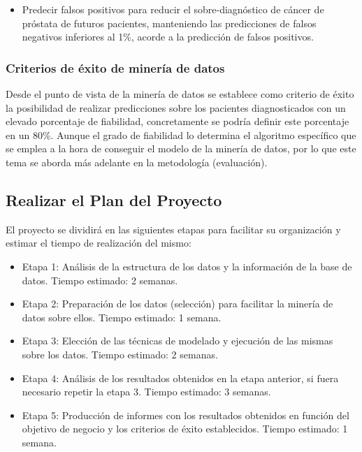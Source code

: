 \documentclass{article}
\begin{document}
\begin{itemize}
	\item Predecir falsos positivos para reducir el sobre-diagnóstico de cáncer de próstata de futuros pacientes, manteniendo las predicciones de falsos negativos inferiores al 1\%, acorde a la predicción de falsos positivos.
\end{itemize}

\subsubsection{Criterios de éxito de minería de datos}\label{Criterio de éxito de minería de datos}
Desde el punto de vista de la minería de datos se establece como criterio de éxito la posibilidad de realizar predicciones sobre los pacientes diagnosticados con un elevado porcentaje de fiabilidad, concretamente se podría definir este porcentaje en un 80\%. Aunque el grado de fiabilidad lo determina el algoritmo específico que se emplea a la hora de conseguir el modelo de la minería de datos, por lo que este tema se aborda más adelante en la metodología (evaluación).

\subsection{Realizar el Plan del Proyecto}	\label{Realizar el Plan del Proyecto}
El proyecto se dividirá en las siguientes etapas para facilitar su organización y estimar el tiempo de realización del mismo:

\begin{itemize}
	\item Etapa 1: Análisis de la estructura de los datos y la información de la base de datos. Tiempo estimado: 2 semanas.
	\item Etapa 2: Preparación de los datos (selección) para facilitar la minería de datos sobre ellos. Tiempo estimado: 1 semana.
	\item Etapa 3: Elección de las técnicas de modelado y ejecución de las mismas sobre los datos. Tiempo estimado: 2 semanas.
	\item Etapa 4: Análisis de los resultados obtenidos en la etapa anterior, si fuera necesario repetir la etapa 3. Tiempo estimado: 3 semanas.
	\item Etapa 5: Producción de informes con los resultados obtenidos en función del objetivo de negocio y los criterios de éxito establecidos. Tiempo estimado: 1 semana.
\end{itemize}
\end{document}

